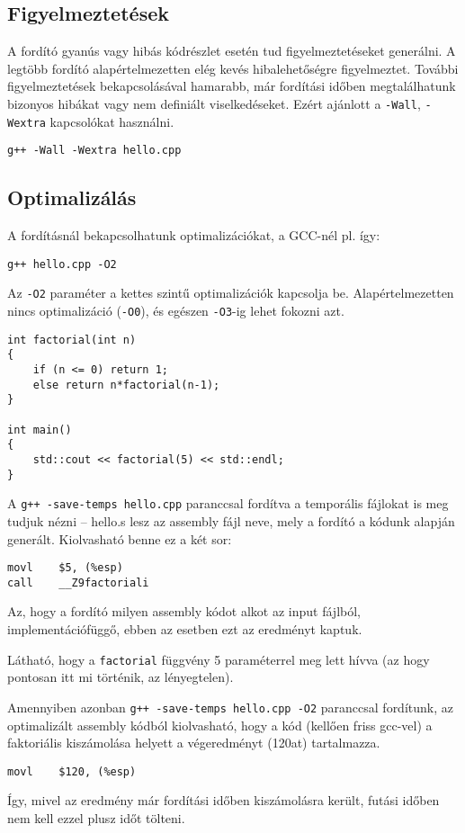 \documentclass[a4paper,11.5pt,table]{article}
\begin{document}
	\subsection{Figyelmeztetések}

  A fordító gyanús vagy hibás kódrészlet esetén tud figyelmeztetéseket generálni. A legtöbb fordító alapértelmezetten elég kevés hibalehetőségre figyelmeztet. További figyelmeztetések bekapcsolásával hamarabb, már fordítási időben megtalálhatunk bizonyos hibákat vagy nem definiált viselkedéseket. Ezért ajánlott a \texttt{-Wall}, \texttt{-Wextra} kapcsolókat használni.

	{\centering \texttt{g++ -Wall -Wextra hello.cpp} \par}

	\subsection{Optimalizálás}
	A fordításnál bekapcsolhatunk optimalizációkat, a GCC-nél pl. így:
	
	{\centering \texttt{g++ hello.cpp -O2} \par}
	
	Az \texttt{-O2} paraméter a kettes szintű optimalizációk kapcsolja be. Alapértelmezetten nincs optimalizáció (\texttt{-O0}), és egészen \texttt{-O3}-ig lehet fokozni azt.
	\bigskip
	
	\begin{lstlisting}
int factorial(int n)
{
	if (n <= 0) return 1;
	else return n*factorial(n-1);
}

int main()
{
	std::cout << factorial(5) << std::endl;
}
	\end{lstlisting}
	
	A \texttt{g++ -save-temps hello.cpp} paranccsal fordítva a temporális fájlokat is meg tudjuk nézni -- hello.s lesz az assembly fájl neve, mely a fordító a kódunk alapján generált. Kiolvasható benne ez a két sor:
	\begin{lstlisting}[style = customasm]
movl 	$5, (%esp)
call	__Z9factoriali
	\end{lstlisting}
	\begin{note}
		Az, hogy a fordító milyen assembly kódot alkot az input fájlból, implementációfüggő, ebben az esetben ezt az eredményt kaptuk.
	\end{note}
	Látható, hogy a \texttt{factorial} függvény 5 paraméterrel meg lett hívva (az hogy pontosan itt mi történik, az lényegtelen).
	
	\medskip
	Amennyiben azonban \texttt{g++ -save-temps hello.cpp -O2} paranccsal fordítunk, az optimalizált assembly kódból kiolvasható, hogy a kód (kellően friss gcc-vel) a faktoriális kiszámolása helyett a végeredményt (120at) tartalmazza. 
	\begin{lstlisting}[style = customasm]
movl	$120, (%esp)
	\end{lstlisting}
	Így, mivel az eredmény már fordítási időben kiszámolásra került, futási időben nem kell ezzel plusz időt tölteni.
	
\end{document}
